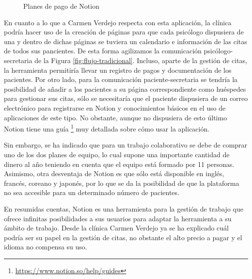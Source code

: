 \begin{figure}[H]
    \caption{Planes de pago de Notion}
    \label{fig:precios-notion}
\end{figure}

En cuanto a lo que a Carmen Verdejo respecta con esta aplicación, la clínica podría hacer uso de la creación de páginas para que cada psicólogo dispusiera de una y dentro de dichas páginas se tuviera un calendario e información de las citas de todos sus pancientes. De esta forma agilizamos la comunicación psicólogo-secretaria de la Figura \ref{fig:flujo-tradicional}. Incluso, aparte de la gestión de citas, la herramienta permitiría llevar un registro de pagos y documentación de los pacientes. Por otro lado, para la comunicación paciente-secretaria se tendría la posibilidad de añadir a los pacientes a su página correspondiente como huéspedes para gestionar sus citas, sólo se necesitaría que el paciente dispusiera de un correo electrónico para registrarse en Notion y conocimientos básicos en el uso de aplicaciones de este tipo. No obstante, aunque no dispusiera de esto último Notion tiene una guía \footnote{\url{https://www.notion.so/help/guides}} muy detallada sobre cómo usar la aplicación. \bigskip

Sin embargo, se ha indicado que para un trabajo colaborativo se debe de comprar uno de los dos planes de equipo, lo cual supone una importante cantidad de dinero al año teniendo en cuenta que el equipo está formado por 11 personas. Asimismo, otra desventaja de Notion es que sólo está disponible en inglés, francés, coreano y japonés, por lo que se da la posibilidad de que la plataforma no sea accesible para un determinado número de pacientes. \bigskip

En resumidas cuentas, Notion es una herramienta para la gestión de trabajo que ofrece infinitas posibilidades a sus usuarios para adaptar la herramienta a su ámbito de trabajo. Desde la clínica Carmen Verdejo ya se ha explicado cuál podría ser su papel en la gestión de citas, no obstante el alto precio a pagar y el idioma no compensa su uso. 

